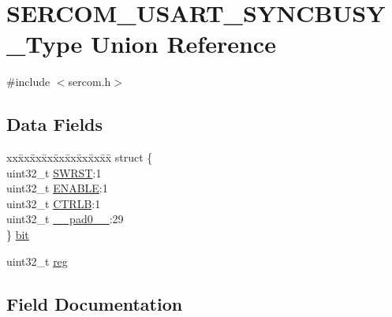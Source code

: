 \hypertarget{union_s_e_r_c_o_m___u_s_a_r_t___s_y_n_c_b_u_s_y___type}{}\section{S\+E\+R\+C\+O\+M\+\_\+\+U\+S\+A\+R\+T\+\_\+\+S\+Y\+N\+C\+B\+U\+S\+Y\+\_\+\+Type Union Reference}
\label{union_s_e_r_c_o_m___u_s_a_r_t___s_y_n_c_b_u_s_y___type}


{\ttfamily \#include $<$sercom.\+h$>$}

\subsection*{Data Fields}
\begin{DoxyCompactItemize}
\item 
\begin{tabbing}
xx\=xx\=xx\=xx\=xx\=xx\=xx\=xx\=xx\=\kill
struct \{\\
\>uint32\_t \mbox{\hyperlink{union_s_e_r_c_o_m___u_s_a_r_t___s_y_n_c_b_u_s_y___type_a34cd956a8da179cbd5fc9060306d420e}{SWRST}}:1\\
\>uint32\_t \mbox{\hyperlink{union_s_e_r_c_o_m___u_s_a_r_t___s_y_n_c_b_u_s_y___type_a66f979832c85e0692bd9422b05aff1f7}{ENABLE}}:1\\
\>uint32\_t \mbox{\hyperlink{union_s_e_r_c_o_m___u_s_a_r_t___s_y_n_c_b_u_s_y___type_a0ac0bbc2a904755b6f260b002320735a}{CTRLB}}:1\\
\>uint32\_t \mbox{\hyperlink{union_s_e_r_c_o_m___u_s_a_r_t___s_y_n_c_b_u_s_y___type_a3e57c2ef1c3ffb36722f000cc1156824}{\_\_pad0\_\_}}:29\\
\} \mbox{\hyperlink{union_s_e_r_c_o_m___u_s_a_r_t___s_y_n_c_b_u_s_y___type_a3214972acff963d8571c59053d44e80d}{bit}}\\

\end{tabbing}\item 
uint32\+\_\+t \mbox{\hyperlink{union_s_e_r_c_o_m___u_s_a_r_t___s_y_n_c_b_u_s_y___type_a6b91636401516a477989a336376d7b40}{reg}}
\end{DoxyCompactItemize}


\subsection{Field Documentation}
\mbox{\label{union_s_e_r_c_o_m___u_s_a_r_t___s_y_n_c_b_u_s_y___type_a3e57c2ef1c3ffb36722f000cc1156824}} 
